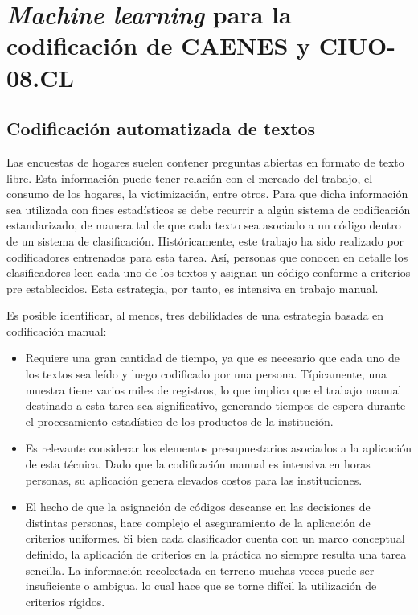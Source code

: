\documentclass[
  12pt,
  spanish,
]{article}
\begin{document}
\newpage

\hypertarget{machine-learning-para-la-codificaciuxf3n-de-caenes-y-ciuo-08.cl}{%
\section{\texorpdfstring{\emph{Machine learning} para la codificación de
CAENES y
CIUO-08.CL}{Machine learning para la codificación de CAENES y CIUO-08.CL}}\label{machine-learning-para-la-codificaciuxf3n-de-caenes-y-ciuo-08.cl}}

\hypertarget{codificaciuxf3n-automatizada-de-textos}{%
\subsection{Codificación automatizada de
textos}\label{codificaciuxf3n-automatizada-de-textos}}

Las encuestas de hogares suelen contener preguntas abiertas en formato
de texto libre. Esta información puede tener relación con el mercado del
trabajo, el consumo de los hogares, la victimización, entre otros. Para
que dicha información sea utilizada con fines estadísticos se debe
recurrir a algún sistema de codificación estandarizado, de manera tal de
que cada texto sea asociado a un código dentro de un sistema de
clasificación. Históricamente, este trabajo ha sido realizado por
codificadores entrenados para esta tarea. Así, personas que conocen en
detalle los clasificadores leen cada uno de los textos y asignan un
código conforme a criterios pre establecidos. Esta estrategia, por
tanto, es intensiva en trabajo manual.

Es posible identificar, al menos, tres debilidades de una estrategia
basada en codificación manual:

\begin{itemize}
\item
  Requiere una gran cantidad de tiempo, ya que es necesario que cada uno
  de los textos sea leído y luego codificado por una persona.
  Típicamente, una muestra tiene varios miles de registros, lo que
  implica que el trabajo manual destinado a esta tarea sea
  significativo, generando tiempos de espera durante el procesamiento
  estadístico de los productos de la institución.
\item
  Es relevante considerar los elementos presupuestarios asociados a la
  aplicación de esta técnica. Dado que la codificación manual es
  intensiva en horas personas, su aplicación genera elevados costos para
  las instituciones.
\item
  El hecho de que la asignación de códigos descanse en las decisiones de
  distintas personas, hace complejo el aseguramiento de la aplicación de
  criterios uniformes. Si bien cada clasificador cuenta con un marco
  conceptual definido, la aplicación de criterios en la práctica no
  siempre resulta una tarea sencilla. La información recolectada en
  terreno muchas veces puede ser insuficiente o ambigua, lo cual hace
  que se torne difícil la utilización de criterios rígidos.
\end{itemize}
\end{document}
